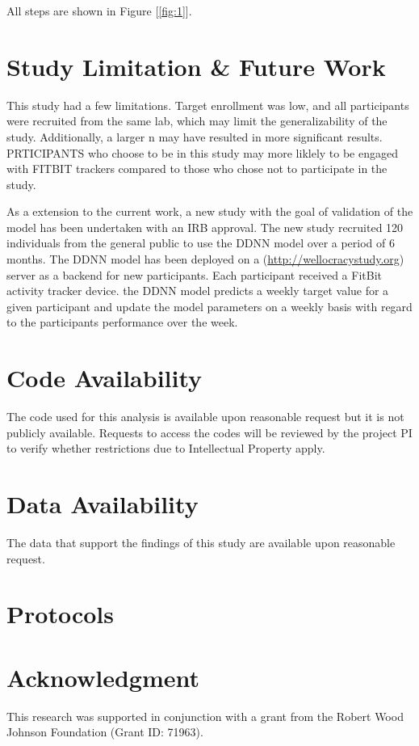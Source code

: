 \documentclass[preprint,12pt]{elsarticle}
\begin{document}
All steps are shown in Figure [\ref{fig:1}].

\section{Study Limitation \& Future Work}
This study had a few limitations. Target enrollment was low, and all participants
were recruited from the same lab, which may limit the generalizability of the
study. Additionally, a larger n may have resulted in more significant results.
PRTICIPANTS who choose to be in this study may more liklely to be engaged with FITBIT trackers compared to those who chose not to participate in the study.
\par
As a extension to the current work, a new study with the goal of validation of the model has been undertaken with an IRB approval. The new study recruited 120 individuals from the general public to use the DDNN model over a period of 6 months. The DDNN model has been deployed on a (\url{http://wellocracystudy.org}) server as a backend for new participants. Each participant received a FitBit activity tracker device. the DDNN model predicts a weekly target value for a given participant and update the model parameters on a weekly basis with regard to the participants performance over the week. 



\section{Code Availability}
The code used for this analysis is available upon reasonable request but it
is not publicly available. Requests to access the codes will be reviewed by
the project PI to verify whether restrictions due to Intellectual
Property apply.

\section{Data Availability}
The data that support the findings of this study are available upon reasonable
request.

\section{Protocols}

\section{Acknowledgment}
This research was supported in conjunction with a grant from the Robert Wood Johnson Foundation (Grant ID: 71963).
\end{document}
